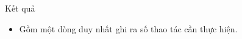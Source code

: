 Kết quả
\begin{itemize}
	\item     Gồm một dòng duy nhất ghi ra số thao tác cần thực hiện.   
\end{itemize}